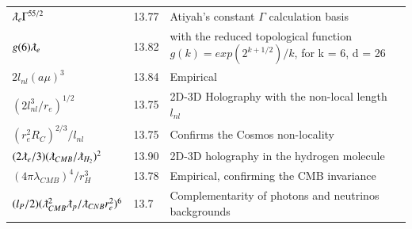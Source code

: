 \documentclass[a4paper,9pt]{article}
\begin{document}
\begin{table}
\begin{tabular}{lll}
$ \lambdabar_{e} \Gamma^{55/2}$ & 13.77 & Atiyah's constant $\Gamma$ calculation basis   \\  
  
  
 
 
 
 
 $ g(6) \lambdabar_{e} $ & 13.82 & with the reduced topological function $g(k) = exp(2^{k+1/2})/k$, for k = 6, d = 26  \\
 
 
 $ 2l_{nl}(a\mu)^3 $ & 13.84 & Empirical \\
 
 
 
 
 
 
 
 
 $ (2l_{nl}^3/r_e)^{1/2}$  & 13.75    & 2D-3D Holography with the non-local length $l_{nl}$ \\
 
  $ (r_e^2R_C)^{2/3}/l_{nl}$  & 13.75    & Confirms the Cosmos non-locality \\
  
 
 
 $ (2\lambdabar_{e}/3) (\lambdabar_{CMB}/\lambdabar_{H_2})^2$ & 13.90 &  2D-3D holography in the hydrogen molecule \\
     
   $ (4\pi \lambda_{CMB})^4/r_H^3$ & 13.78 &  Empirical, confirming the CMB invariance \\
   
    $ (l_P/2)(\lambdabar_{CMB}^2\lambdabar_p/\lambdabar_{CNB}r_e^2)^6$  & 13.7    & Complementarity of photons and neutrinos backgrounds \\
   
 
 
 \bottomrule
  \end{tabular}
\end{table} 
 
\end{document}
